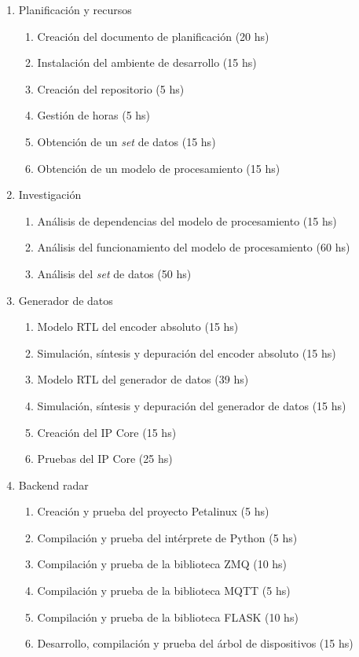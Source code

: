 \documentclass[
11pt, %
]{charter}
\begin{document}
\begin{enumerate}
\item Planificación y recursos
	\begin{enumerate}
	\item Creación del documento de planificación (20 hs)
	\item Instalación del ambiente de desarrollo (15 hs)
	\item Creación del repositorio (5 hs)
	\item Gestión de horas (5 hs)
	\item Obtención de un \emph{set} de datos (15 hs)
	\item Obtención de un modelo de procesamiento (15 hs)
	\end{enumerate}
\item Investigación
	\begin{enumerate}
	\item Análisis de dependencias del modelo de procesamiento (15 hs)
	\item Análisis del funcionamiento del modelo de procesamiento (60 hs)
	\item Análisis del \emph{set} de datos (50 hs)
	\end{enumerate}
\item Generador de datos
	\begin{enumerate}
	\item Modelo RTL del encoder absoluto (15 hs)
	\item Simulación, síntesis y depuración del encoder absoluto (15 hs)
	\item Modelo RTL del generador de datos (39 hs)
	\item Simulación, síntesis y depuración del generador de datos (15 hs)
	\item Creación del IP Core (15 hs)
	\item Pruebas del IP Core (25 hs)
	\end{enumerate}
\item Backend radar
	\begin{enumerate}
	\item Creación y prueba del proyecto Petalinux (5 hs)
	\item Compilación y prueba del intérprete de Python (5 hs)
	\item Compilación y prueba de la biblioteca ZMQ (10 hs)
	\item Compilación y prueba de la biblioteca MQTT (5 hs)
	\item Compilación y prueba de la biblioteca FLASK (10 hs)
	\item Desarrollo, compilación y prueba del árbol de dispositivos (15 hs)

\end{enumerate}
\end{enumerate}
\end{document}
